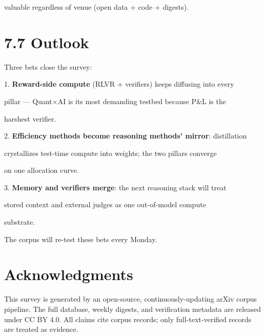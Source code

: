 \documentclass[11pt]{article}
\begin{document}
valuable regardless of venue (open data + code + digests).


\section{7.7 Outlook}

Three bets close the survey:


1. \textbf{Reward-side compute} (RLVR + verifiers) keeps diffusing into every

pillar --- Quant$\times$AI is its most demanding testbed because P\&L is the

harshest verifier.

2. \textbf{Efficiency methods become reasoning methods' mirror}: distillation

crystallizes test-time compute into weights; the two pillars converge

on one allocation curve.

3. \textbf{Memory and verifiers merge}: the next reasoning stack will treat

stored context and external judges as one out-of-model compute

substrate.


The corpus will re-test these bets every Monday.




\section*{Acknowledgments}
This survey is generated by an open-source, continuously-updating arXiv
corpus pipeline. The full database, weekly digests, and verification
metadata are released under CC BY 4.0. All claims cite corpus records;
only full-text-verified records are treated as evidence.
\end{document}

